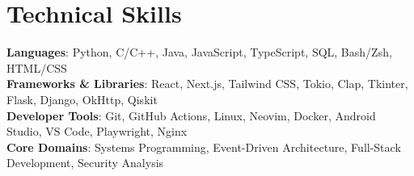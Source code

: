 \documentclass[letterpaper,11pt]{article}
\begin{document}
\section{Technical Skills}
 \begin{itemize}[leftmargin=0.15in, label={}]
    \small{\item{
     \textbf{Languages}{: Python, C/C++, Java, JavaScript, TypeScript, SQL, Bash/Zsh, HTML/CSS} \\
     \textbf{Frameworks \& Libraries}{: React, Next.js, Tailwind CSS, Tokio, Clap, Tkinter, Flask, Django, OkHttp, Qiskit} \\
     \textbf{Developer Tools}{: Git, GitHub Actions, Linux, Neovim, Docker, Android Studio, VS Code, Playwright, Nginx} \\
     \textbf{Core Domains}{: Systems Programming, Event-Driven Architecture, Full-Stack Development, Security Analysis}
    }}
 \end{itemize}

\end{document}
